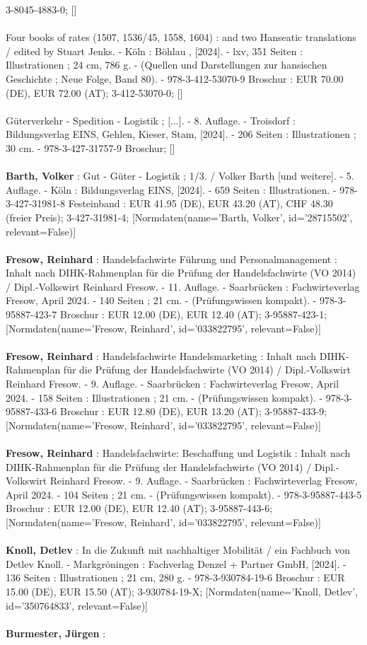 \documentclass{article}
\begin{document}
\begin{multicols}{3}
3-8045-4883-0; []\\\\Four books of rates (1507, 1536/45, 1558, 1604) : and two Hanseatic translations  / edited by Stuart Jenks. - Köln : Böhlau , [2024]. - lxv, 351 Seiten : Illustrationen ; 24 cm, 786 g. - (Quellen und Darstellungen zur hansischen Geschichte ; Neue Folge, Band 80). - 978-3-412-53070-9 Broschur : EUR 70.00 (DE), EUR 72.00 (AT); 3-412-53070-0; []\\\\Güterverkehr - Spedition - Logistik ; [...]. - 8. Auflage. - Troisdorf : Bildungsverlag EINS, Gehlen, Kieser, Stam, [2024]. - 206 Seiten : Illustrationen ; 30 cm. - 978-3-427-31757-9 Broschur; []\\\\\textbf{Barth, Volker} : Gut - Güter - Logistik ; 1/3. / Volker Barth [und weitere]. - 5. Auflage. - Köln : Bildungsverlag EINS, [2024]. - 659 Seiten : Illustrationen. - 978-3-427-31981-8 Festeinband : EUR 41.95 (DE), EUR 43.20 (AT), CHF 48.30 (freier Preis); 3-427-31981-4; [Normdaten(name='Barth, Volker', id='28715502', relevant=False)]\\\\\textbf{Fresow, Reinhard} : Handelsfachwirte Führung und Personalmanagement : Inhalt nach DIHK-Rahmenplan für die Prüfung der Handelsfachwirte (VO 2014) / Dipl.-Volkswirt Reinhard Fresow. - 11. Auflage. - Saarbrücken : Fachwirteverlag Fresow, April 2024. - 140 Seiten ; 21 cm. - (Prüfungswissen kompakt). - 978-3-95887-423-7 Broschur : EUR 12.00 (DE), EUR 12.40 (AT); 3-95887-423-1; [Normdaten(name='Fresow, Reinhard', id='033822795', relevant=False)]\\\\\textbf{Fresow, Reinhard} : Handelsfachwirte Handelsmarketing : Inhalt nach DIHK-Rahmenplan für die Prüfung der Handelsfachwirte (VO 2014) / Dipl.-Volkswirt Reinhard Fresow. - 9. Auflage. - Saarbrücken : Fachwirteverlag Fresow, April 2024. - 158 Seiten : Illustrationen ; 21 cm. - (Prüfungswissen kompakt). - 978-3-95887-433-6 Broschur : EUR 12.80 (DE), EUR 13.20 (AT); 3-95887-433-9; [Normdaten(name='Fresow, Reinhard', id='033822795', relevant=False)]\\\\\textbf{Fresow, Reinhard} : Handelsfachwirte: Beschaffung und Logistik : Inhalt nach DIHK-Rahmenplan für die Prüfung der Handelsfachwirte (VO 2014) / Dipl.-Volkswirt Reinhard Fresow. - 9. Auflage. - Saarbrücken : Fachwirteverlag Fresow, April 2024. - 104 Seiten ; 21 cm. - (Prüfungswissen kompakt). - 978-3-95887-443-5 Broschur : EUR 12.00 (DE), EUR 12.40 (AT); 3-95887-443-6; [Normdaten(name='Fresow, Reinhard', id='033822795', relevant=False)]\\\\\textbf{Knoll, Detlev} : In die Zukunft mit nachhaltiger Mobilität / ein Fachbuch von Detlev Knoll. - Markgröningen : Fachverlag Denzel + Partner GmbH, [2024]. - 136 Seiten : Illustrationen ; 21 cm, 280 g. - 978-3-930784-19-6 Broschur : EUR 15.00 (DE), EUR 15.50 (AT); 3-930784-19-X; [Normdaten(name='Knoll, Detlev', id='350764833', relevant=False)]\\\\\textbf{Burmester, Jürgen} : 
\end{multicols}
\end{document}
